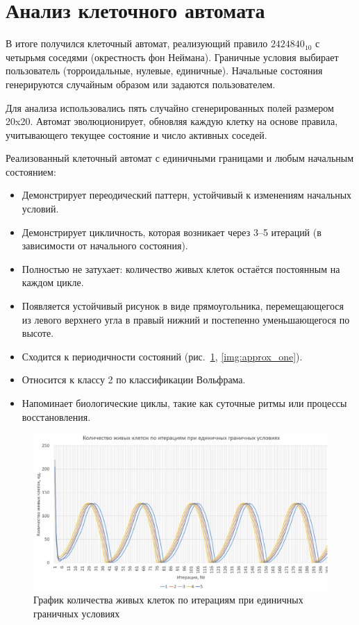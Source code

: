 \documentclass[a4paper, final]{article}
\begin{document}
\newpage
\section{Анализ клеточного автомата}
В  итоге получился клеточный автомат, реализующий правило $2424840_{10}$ с четырьмя соседями (окрестность фон Неймана). 
Граничные условия выбирает пользователь (торроидальные, нулевые, единичные). Начальные состояния генерируются 
случайным образом или задаются пользователем. 

Для анализа использовались пять случайно сгенерированных полей размером 20x20.
Автомат эволюционирует, обновляя каждую клетку на основе правила, учитывающего текущее состояние и число 
активных соседей.

Реализованный клеточный автомат с единичными границами и любым начальным состоянием:
\begin{itemize}
  \item Демонстрирует переодический паттерн, устойчивый к изменениям начальных условий.
  \item Демонстрирует цикличность, которая возникает через 3–5 итераций (в зависимости от начального состояния).
  \item Полностью не затухает: количество живых клеток остаётся постоянным на каждом цикле.
  \item Появляется устойчивый рисунок в виде прямоугольника, перемещающегося из левого верхнего угла в правый нижний
  и постепенно уменьшающегося по высоте.
  \item Сходится к периодичности состояний (рис.~\ref{img:graph_one}, \ref{img:approx_one}).
  \item Относится к классу 2 по классификации Вольфрама.
  \item Напоминает биологические циклы, такие как суточные ритмы или процессы восстановления.
\end{itemize}

\begin{figure}[h!]
   \centering
   \includegraphics[width=0.8\linewidth]{graph_one.png}
   \caption{График количества живых клеток по итерациям при единичных граничных условиях}
   \label{img:graph_one}
\end{figure}
\end{document}
